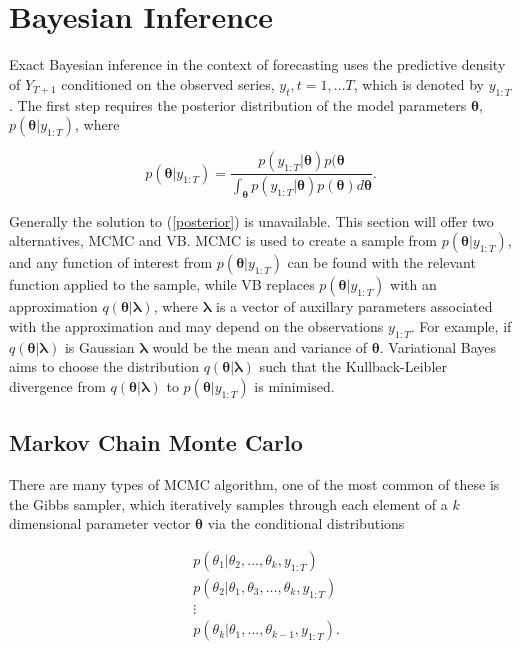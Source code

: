 \documentclass[12pt,a4paper]{article}%
\numberwithin{equation}{section}
\begin{document}
\section{Bayesian Inference}

Exact Bayesian inference in the context of forecasting uses the predictive density of $Y_{T+1}$ conditioned on the observed series, $y_{t}, t = 1, \dots T$, which is denoted by $y_{1:T}$. The first step requires the posterior distribution of the model parameters $\boldsymbol{\theta}$, $p(\boldsymbol{\theta} | y_{1:T})$, where

\begin{equation}
\label{posterior}
 p(\boldsymbol{\theta} | y_{1:T}) = \frac{p(y_{1:T}|\boldsymbol{\theta})p(\boldsymbol{\theta}}{\int_{\boldsymbol{\theta}}p(y_{1:T}|\boldsymbol{\theta})p(\boldsymbol{\theta}) d\boldsymbol{\theta}}.
\end{equation}

Generally the solution to (\ref{posterior}) is unavailable. This section will offer two alternatives, MCMC and VB.
MCMC is used to create a sample from $p(\boldsymbol{\theta} | y_{1:T})$, and any function of interest from $p(\boldsymbol{\theta} | y_{1:T})$ can be found with the relevant function applied to the sample, while VB replaces $p(\boldsymbol{\theta} | y_{1:T})$ with an approximation $q(\boldsymbol{\theta} | \boldsymbol{\lambda})$, where $\boldsymbol{\lambda}$ is a vector of auxillary parameters associated with the approximation and may depend on the observations $y_{1:T}$. For example, if $q(\boldsymbol{\theta} | \boldsymbol{\lambda})$ is Gaussian $\boldsymbol{\lambda}$ would be the mean and variance of $\boldsymbol{\theta}$. Variational Bayes aims to choose the distribution $q(\boldsymbol{\theta} | \boldsymbol{\lambda})$ such that the Kullback-Leibler divergence from $q(\boldsymbol{\theta} | \boldsymbol{\lambda})$ to $p(\boldsymbol{\theta} | y_{1:T})$ is minimised.

\subsection{Markov Chain Monte Carlo}

There are many types of MCMC algorithm, one of the most common of these is the Gibbs sampler, which iteratively samples through each element of a $k$ dimensional parameter vector $\boldsymbol{\theta}$ via the conditional distributions

\begin{align}
&p(\theta_1 | \theta_2, \dots, \theta_k, y_{1:T}) \nonumber \\
&p(\theta_2 | \theta_1, \theta_3, \dots, \theta_k, y_{1:T}) \nonumber \\
&\vdots \nonumber \\
&p(\theta_k | \theta_1, \dots, \theta_{k-1}, y_{1:T}). \nonumber
\end{align}
\end{document}
